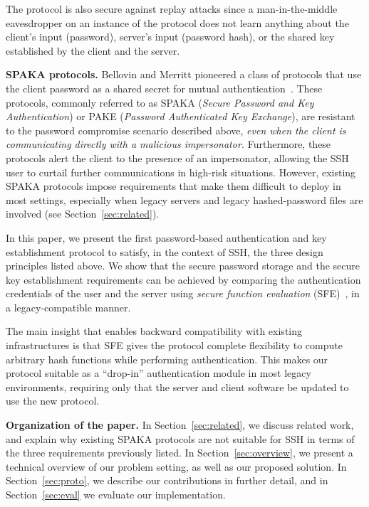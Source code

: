 The protocol is also secure against replay attacks since a
man-in-the-middle eavesdropper on an instance of the protocol does not
learn anything about the client's input (password), server's input
(password hash), or the shared key established by the client and
the server.



\vspace{1ex}
\noindent
\textbf{SPAKA protocols.}  Bellovin and Merritt pioneered a class of
protocols that use the client password as a shared secret for mutual
authentication~\cite{bellovin92}. These protocols, commonly referred
to as SPAKA (\emph{Secure Password and Key Authentication}) or PAKE
(\emph{Password Authenticated Key Exchange}), are resistant to the
password compromise scenario described above, \emph{even when the
client is communicating directly with a malicious impersonator.}
Furthermore, these protocols alert the client to the presence of an
impersonator, allowing the SSH user to curtail further communications
in high-risk situations.  However, existing SPAKA protocols impose
requirements that make them difficult to deploy in most settings,
especially when legacy servers and legacy hashed-password files are
involved (see Section~\ref{sec:related}).

In this paper, we present the first password-based authentication and
key establishment protocol to satisfy, in the context of SSH, the
three design principles listed above.  We show that the secure
password storage and the secure key establishment requirements can be
achieved by comparing the authentication credentials of the user and
the server using \emph{secure function evaluation} (SFE)~\cite{Y82},
in a legacy-compatible manner.

The main insight that enables backward compatibility with existing
infrastructures is that SFE gives the protocol complete flexibility to
compute arbitrary hash functions while performing authentication.
This makes our protocol suitable as a ``drop-in'' authentication
module in most legacy environments, requiring only that the server and
client software be updated to use the new protocol.


\vspace{1ex}
\noindent
\textbf{Organization of the paper.}  In Section~\ref{sec:related}, we
discuss related work, and explain why existing SPAKA protocols are not
suitable for SSH in terms of the three requirements previously
listed. In Section~\ref{sec:overview}, we present a technical overview
of our problem setting, as well as our proposed solution. In
Section~\ref{sec:proto}, we describe our contributions in further
detail, and in Section~\ref{sec:eval} we evaluate our implementation.
